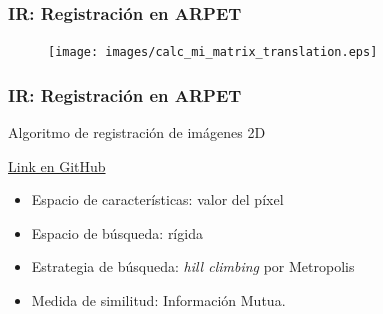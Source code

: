 \documentclass{beamer} %
\begin{document}
\begin{frame}
\frametitle{IR: Registración en ARPET}

\begin{figure}
  \texttt{[image: images/calc\_mi\_matrix\_translation.eps]}
\end{figure}

\end{frame}

\begin{frame}
\frametitle{IR: Registración en ARPET}

Algoritmo de registración de imágenes 2D

\href{https://github.com/ahestevenz/ip-image-registration}{Link en GitHub}

\begin{itemize}
\pause
\item Espacio de características: valor del píxel
\pause
\item Espacio de búsqueda: rígida
\pause
\item Estrategia de búsqueda: \textit{hill climbing} por Metropolis
\pause
\item Medida de similitud: Información Mutua.
\end{itemize}

\end{frame}
\end{document}
